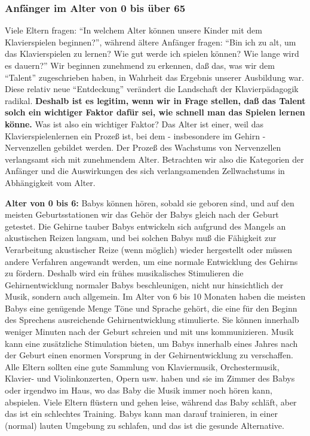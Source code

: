\subsubsection{Anfänger im Alter von 0 bis über 65}
\label{c1iii18c}

Viele Eltern fragen: \enquote{In welchem Alter können unsere Kinder mit dem Klavierspielen beginnen?},
während ältere Anfänger fragen: \enquote{Bin ich zu alt, um das Klavierspielen zu lernen?
Wie gut werde ich spielen können?
Wie lange wird es dauern?}
Wir beginnen zunehmend zu erkennen, daß das, was wir dem \enquote{Talent} zugeschrieben haben, in Wahrheit das Ergebnis unserer Ausbildung war.
Diese relativ neue \enquote{Entdeckung} verändert die Landschaft der Klavierpädagogik radikal.
\textbf{Deshalb ist es legitim, wenn wir in Frage stellen, daß das Talent solch ein wichtiger Faktor dafür sei, wie schnell man das Spielen lernen könne.}
Was ist also ein wichtiger Faktor?
Das Alter ist einer, weil das Klavierspielenlernen ein Prozeß ist, bei dem - insbesondere im Gehirn - Nervenzellen gebildet werden.
Der Prozeß des Wachstums von Nervenzellen verlangsamt sich mit zunehmendem Alter.
Betrachten wir also die Kategorien der Anfänger und die Auswirkungen des sich verlangsamenden Zellwachstums in Abhängigkeit vom Alter.


\label{c1iii18c0}

\textbf{Alter von 0 bis 6:} Babys können hören, sobald sie geboren sind, und auf den meisten Geburtsstationen wir das Gehör der Babys gleich nach der Geburt getestet.
Die Gehirne tauber Babys entwickeln sich aufgrund des Mangels an akustischen Reizen langsam, und bei solchen Babys muß die Fähigkeit zur Verarbeitung akustischer Reize (wenn möglich) wieder hergestellt oder müssen andere Verfahren angewandt werden, um eine normale Entwicklung des Gehirns zu fördern.
Deshalb wird ein frühes musikalisches Stimulieren die Gehirnentwicklung normaler Babys beschleunigen, nicht nur hinsichtlich der Musik, sondern auch allgemein.
Im Alter von 6 bis 10 Monaten haben die meisten Babys eine genügende Menge Töne und Sprache gehört, die eine für den Beginn des Sprechens ausreichende Gehirnentwicklung stimulierte.
Sie können innerhalb weniger Minuten nach der Geburt schreien und mit uns kommunizieren.
Musik kann eine zusätzliche Stimulation bieten, um Babys innerhalb eines Jahres nach der Geburt einen enormen Vorsprung in der Gehirnentwicklung zu verschaffen.
Alle Eltern sollten eine gute Sammlung von Klaviermusik, Orchestermusik, Klavier- und Violinkonzerten, Opern usw. haben und sie im Zimmer des Babys oder irgendwo im Haus, wo das Baby die Musik immer noch hören kann, abspielen.
Viele Eltern flüstern und gehen leise, während das Baby schläft, aber das ist ein schlechtes Training.
Babys kann man darauf trainieren, in einer (normal) lauten Umgebung zu schlafen, und das ist die gesunde Alternative.

